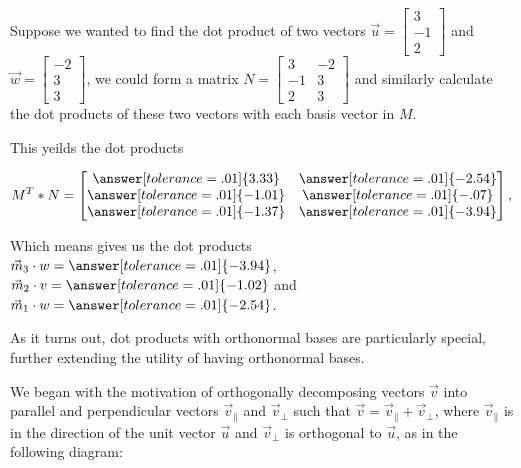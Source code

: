 \documentclass{ximera}
\begin{document}
\begin{example}
   Suppose we wanted to find the dot product of two vectors $\vec{u}=\begin{bmatrix}
   3\\-1\\2
   \end{bmatrix}$ and $\vec{w}=\begin{bmatrix}
      -2\\3\\3
   \end{bmatrix}$, we could form a matrix $N=\begin{bmatrix}3&-2\\-1&3\\2&3
   \end{bmatrix}$ and similarly calculate the dot products of these two vectors with each basis vector in $M$. 

   This yeilds the dot products

   $$M^T*N=\begin{bmatrix}
      \answer[tolerance=.01]{3.33}&\answer[tolerance=.01]{-2.54}\\\answer[tolerance=.01]{-1.01}&\answer[tolerance=.01]{-.07}\\
      \answer[tolerance=.01]{-1.37}&\answer[tolerance=.01]{-3.94}
   \end{bmatrix},$$

   Which means gives us the dot products $\vec{m}_3\cdot w=\answer[tolerance=.01]{-3.94}$, $\vec{m}_2\cdot v=\answer[tolerance=.01]{-1.02}$ and $\vec{m}_1\cdot w=\answer[tolerance=.01]{-2.54}$.

\end{example}

As it turns out, dot products with orthonormal bases are particularly special, further extending the utility of having orthonormal bases.

We began with the motivation of orthogonally decomposing vectors $\vec{v}$ into parallel and perpendicular vectors $\vec{v}_\parallel$ and $\vec{v}_\perp$ such that $\vec{v}=\vec{v}_\parallel+\vec{v}_\perp$, where $\vec{v}_\parallel$ is in the direction of the unit vector $\vec{u}$ and $\vec{v}_\perp$ is orthogonal to $\vec{u}$, as in the following diagram:

\begin{center}
   
  \end{center}
\end{document}
